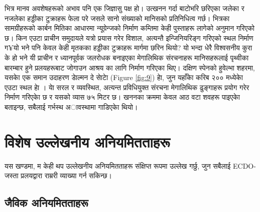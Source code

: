 \documentclass[10pt,twocolumn,letterpaper]{article}
\begin{document}
भित्र मानव अवशेषहरूको अभाव पनि एक जिज्ञासु पक्ष हो। उत्खनन गर्दा बाटोभरि छरिएका जलेका र नजलेका हड्डीका टुक्राहरू फेला परे जसले सानो संख्याको मानिसको प्रतिनिधित्व गर्छ। भित्रका सामग्रीहरूको कार्बन मितिका आधारमा न्यूग्रेन्जको निर्माण कम्तिमा केही पुस्ताहरू लागेको अनुमान गरिएको छ। किन एउटा प्राचीन समुदायले यत्रो प्रयास गरेर विशाल, अत्यन्तै इन्जिनियरिङ्ग गरिएको स्थल निर्माण ग¥यो भने पनि केवल केही मृतकका हड्डीका टुक्राहरू मार्गमा छरिन थियो? यो भन्दा धेरै विश्वसनीय कुरा के हो भने यी प्राचीन र ध्यानपूर्वक जलरोधक बनाइएका मेगालिथिक संरचनाहरू मानिसहरूलाई पृथ्वीका बारम्बार हुने प्रलयहरूबाट जोगाउन आश्रय का लागि निर्माण गरिएका थिए।
दक्षिण स्पेनको हुवेल्भा शहरमा, यसकाे एक समान उदाहरण डाेल्मन दे साेटाे (Figure \ref{fig:9}) हाे, जुन यहाँकाे करिब २०० मध्येकाे एउटा स्थल हाे \cite{72,32}। याे सरल र व्यवस्थित, अत्यन्त प्रविधियुक्त संरचना मेगालिथिक ढुङ्गाहरू प्रयोग गरेर निर्माण गरिएकाे छ र यसको व्यास ७५ मिटर छ। खननका क्रममा केवल आठ वटा शवहरू पाइएकाे बताइन्छ, सबैलाई गर्भस्थ अावस्थामा गाडिएकाे थियो।

\section{विशेष उल्लेखनीय अनियमितताहरू}

यस खण्डमा, म केही थप उल्लेखनीय अनियमितताहरू संक्षिप्त रूपमा उल्लेख गर्छु, जुन सबैलाई ECDO-जस्ता प्रलयद्वारा राम्ररी व्याख्या गर्न सकिन्छ।

\subsection{जैविक अनियमितताहरू}
\end{document}
